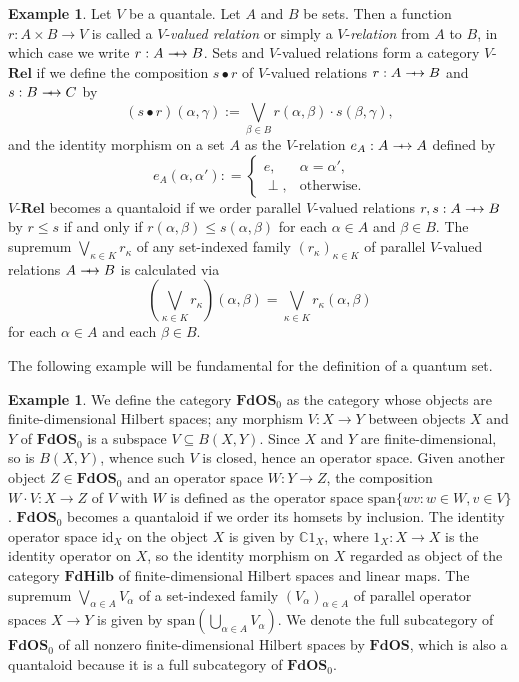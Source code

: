 \documentclass[12pt]{tac}
\theoremstyle{definition}
\newtheorem{example}[theorem]{Example}
\theoremstyle{remark}
\newcommand{\<}{\langle}
\renewcommand{\>}{\rangle}
\renewcommand{\:}{\colon}
\newcommand{\id}{\mathrm{id}}
\def\sto{\relbar\joinrel\mapstochar\joinrel\rightarrow}
\begin{document}
\begin{example}\label{ex:V-valued relations}\cite{monoidaltopology}
Let $V$ be a quantale. Let $A$ and $B$ be sets. Then a function $r:A\times B\to V$ is called a $V$-\emph{valued relation} or simply a $V$-\emph{relation} from $A$ to $B$, in which case we write $r:A\sto B$.  Sets and $V$-valued relations form a category $V$-$\mathbf{Rel}$ if we define the composition $s\bullet r$ of $V$-valued relations $r:A\sto B$ and $s:B\sto C$ by
\[(s\bullet r)(\alpha,\gamma):=\bigvee_{\beta\in B}r(\alpha,\beta)\cdot s(\beta,\gamma),\] and the identity morphism on a set $A$ as the $V$-relation $e_A:A\sto A$ defined by \[e_A(\alpha,\alpha'): =\begin{cases}e, & \alpha=\alpha',\\ \perp, & \text{otherwise}.
\end{cases}\]
$V$-$\mathbf{Rel}$ becomes a quantaloid if we order parallel $V$-valued relations $r,s:A\sto B$ by  $r\leq s$ if and only if $r(\alpha,\beta)\leq s(\alpha,\beta)$ for each $\alpha\in A$ and $\beta\in B$. The supremum $\bigvee_{\kappa\in K}r_\kappa$ of any set-indexed family $(r_\kappa)_{\kappa\in K}$ of parallel $V$-valued relations $A\sto B$ is calculated via \[\left(\bigvee_{\kappa\in K}r_\kappa\right)(\alpha,\beta)=\bigvee_{\kappa\in K}r_\kappa(\alpha,\beta)\]
    for each $\alpha\in A$ and each $\beta\in B$.

\end{example}

The following example will be fundamental for the definition of a quantum set.
\begin{example}\label{ex:FdOS}
   We define the category $\mathbf{FdOS}_0$ as the category whose objects are finite-dimensional Hilbert spaces; any morphism $V:X\to Y$ between objects $X$ and $Y$ of $\mathbf{FdOS}_0$ is a subspace $V\subseteq B(X,Y)$. Since $X$ and $Y$ are finite-dimensional, so is $B(X,Y)$, whence such $V$ is closed, hence an operator space. Given another object $Z\in\mathbf{FdOS}_0$ and an operator space $W:Y\to Z$, the composition $W\cdot V:X\to Z$ of $V$ with $W$ is defined as the operator space $\mathrm{span}\{wv:w\in W,v\in V\}$.
$\mathbf{FdOS}_0$ becomes a quantaloid if we order its homsets by inclusion. The identity operator space $\id_X$ on the object $X$ is given by $\mathbb C1_X$, where $1_X:X\to X$ is the identity operator on $X$, so the identity morphism on $X$ regarded as object of the category $\mathbf{FdHilb}$ of finite-dimensional Hilbert spaces and linear maps. The supremum $\bigvee_{\alpha\in A}V_\alpha$ of a set-indexed family $(V_\alpha)_{\alpha\in A}$ of parallel operator spaces $X\to Y$ is given by $\mathrm{span}\left(\bigcup_{\alpha\in A}V_\alpha\right)$. We denote the full subcategory of $\mathbf{FdOS}_0$ of all nonzero finite-dimensional Hilbert spaces by $\mathbf{FdOS}$, which is also a quantaloid because it is a full subcategory of $\mathbf{FdOS}_0$.
\end{example}
\end{document}
